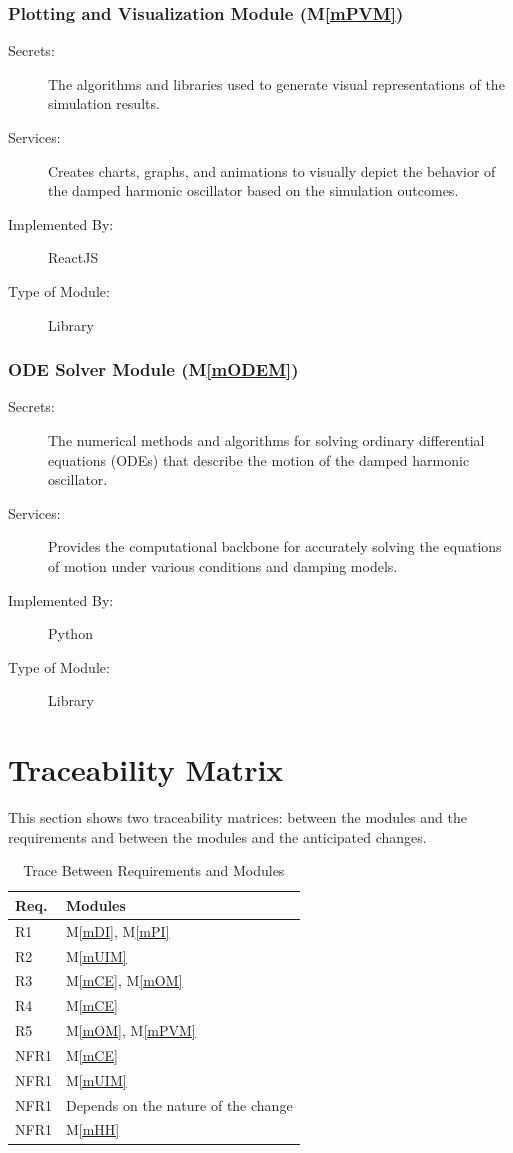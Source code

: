\documentclass[12pt, titlepage]{article}
\newcommand{\mref}[1]{M\ref{#1}}
\begin{document}
\subsubsection{Plotting and Visualization Module (\mref{mPVM})}

\begin{description}
\item[Secrets:]The algorithms and libraries used to generate visual representations of the simulation results.
\item[Services:]Creates charts, graphs, and animations to visually depict the behavior of the damped harmonic oscillator based on the simulation outcomes.
\item[Implemented By:] ReactJS
\item[Type of Module:] Library
\end{description}

\subsubsection{ODE Solver Module (\mref{mODEM})}

\begin{description}
\item[Secrets:]The numerical methods and algorithms for solving ordinary differential equations (ODEs) that describe the motion of the damped harmonic oscillator.
\item[Services:]Provides the computational backbone for accurately solving the equations of motion under various conditions and damping models.
\item[Implemented By:] Python
\item[Type of Module:] Library
\end{description}

\section{Traceability Matrix} \label{SecTM}

This section shows two traceability matrices: between the modules and the
requirements and between the modules and the anticipated changes.

\begin{table}[H]
\centering
\begin{tabular}{p{} p{}}
\toprule
\textbf{Req.} & \textbf{Modules}\\
\midrule
R1 & \mref{mDI}, \mref{mPI}\\
R2 & \mref{mUIM}\\
R3 & \mref{mCE}, \mref{mOM}\\
R4 & \mref{mCE}\\
R5 & \mref{mOM}, \mref{mPVM}\\
NFR1 & \mref{mCE}\\
NFR1 & \mref{mUIM}\\
NFR1 & Depends on the nature of the change\\
NFR1 & \mref{mHH}\\
\bottomrule
\end{tabular}
\caption{Trace Between Requirements and Modules}
\label{TblRT}
\end{table}
\end{document}
